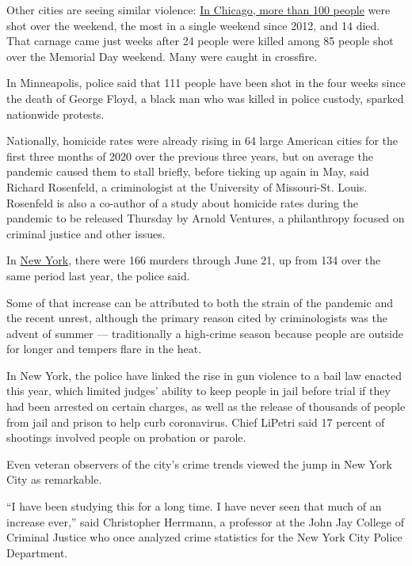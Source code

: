 Other cities are seeing similar violence:
\href{https://www.chicagotribune.com/news/breaking/ct-chicago-weekend-violence-shootings-20200622-ghaioius2zhdpdsbsan4k2g2vu-story.html}{In
Chicago, more than 100 people} were shot over the weekend, the most in a
single weekend since 2012, and 14 died. That carnage came just weeks
after 24 people were killed among 85 people shot over the Memorial Day
weekend. Many were caught in crossfire.

In Minneapolis, police said that 111 people have been shot in the four
weeks since the death of George Floyd, a black man who was killed in
police custody, sparked nationwide protests.

Nationally, homicide rates were already rising in 64 large American
cities for the first three months of 2020 over the previous three years,
but on average the pandemic caused them to stall briefly, before ticking
up again in May, said Richard Rosenfeld, a criminologist at the
University of Missouri-St. Louis. Rosenfeld is also a co-author of a
study about homicide rates during the pandemic to be released Thursday
by Arnold Ventures, a philanthropy focused on criminal justice and other
issues.

In
\href{https://www.nytimes3xbfgragh.onion/2020/07/13/nyregion/Davell-Gardner-brooklyn-shooting.html}{New
York}, there were 166 murders through June 21, up from 134 over the same
period last year, the police said.

Some of that increase can be attributed to both the strain of the
pandemic and the recent unrest, although the primary reason cited by
criminologists was the advent of summer --- traditionally a high-crime
season because people are outside for longer and tempers flare in the
heat.

In New York, the police have linked the rise in gun violence to a bail
law enacted this year, which limited judges' ability to keep people in
jail before trial if they had been arrested on certain charges, as well
as the release of thousands of people from jail and prison to help curb
coronavirus. Chief LiPetri said 17 percent of shootings involved people
on probation or parole.

Even veteran observers of the city's crime trends viewed the jump in New
York City as remarkable.

``I have been studying this for a long time. I have never seen that much
of an increase ever,'' said Christopher Herrmann, a professor at the
John Jay College of Criminal Justice who once analyzed crime statistics
for the New York City Police Department.

